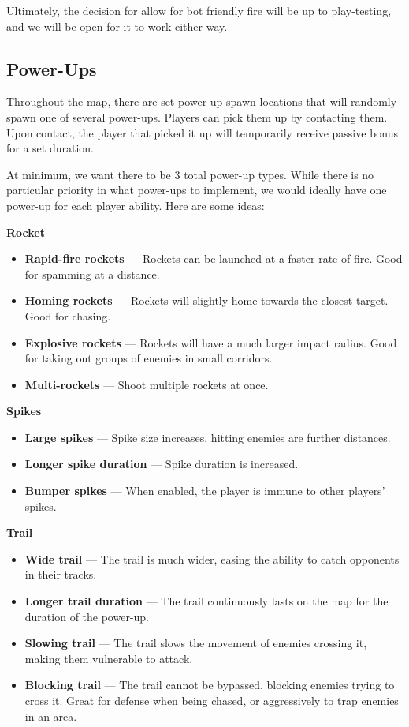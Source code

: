 \documentclass{article}
\theoremstyle{definition}
\begin{document}
Ultimately, the decision for allow for bot friendly fire will be up to
play-testing, and we will be open for it to work either way.

\subsection{Power-Ups}

Throughout the map, there are set power-up spawn locations that will randomly
spawn one of several power-ups. Players can pick them up by contacting them.
Upon contact, the player that picked it up will temporarily receive passive
bonus for a set duration.

At minimum, we want there to be 3 total power-up types. While there is no
particular priority in what power-ups to implement, we would ideally have one
power-up for each player ability. Here are some ideas:

\textbf{Rocket}
\begin{itemize}
  \item \textbf{Rapid-fire rockets} --- Rockets can be launched at a faster rate of
    fire. Good for spamming at a distance.
  \item \textbf{Homing rockets} --- Rockets will slightly home towards the
    closest target. Good for chasing.
  \item \textbf{Explosive rockets} --- Rockets will have a much larger impact
    radius. Good for taking out groups of enemies in small corridors.
  \item \textbf{Multi-rockets} --- Shoot multiple rockets at once.
\end{itemize}

\textbf{Spikes}
\begin{itemize}
  \item \textbf{Large spikes} --- Spike size increases, hitting enemies are
    further distances.
  \item \textbf{Longer spike duration} --- Spike duration is increased.
  \item \textbf{Bumper spikes} --- When enabled, the player is immune to other
    players' spikes.
\end{itemize}

\textbf{Trail}
\begin{itemize}
  \item \textbf{Wide trail} --- The trail is much wider, easing the ability to
    catch opponents in their tracks.
  \item \textbf{Longer trail duration} --- The trail continuously lasts on the map for the
    duration of the power-up.
  \item \textbf{Slowing trail} --- The trail slows the movement of enemies
    crossing it, making them vulnerable to attack.
  \item \textbf{Blocking trail} --- The trail cannot be bypassed, blocking
    enemies trying to cross it. Great for defense when being chased, or
    aggressively to trap enemies in an area.
\end{itemize}
\end{document}
